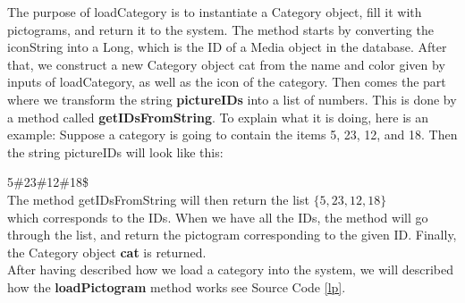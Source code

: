 The purpose of loadCategory is to instantiate a Category object, fill it with pictograms, and return it to the system.
The method starts by converting the iconString into a Long, which is the ID of a Media object in the database.
After that, we construct a new Category object cat from the name and color given by inputs of loadCategory, as well as the icon of the category.
Then comes the part where we transform the string \textbf{pictureIDs} into a list of numbers.
This is done by a method called \textbf{getIDsFromString}.
To explain what it is doing, here is an example:
Suppose a category is going to contain the items 5, 23, 12, and 18. Then the string pictureIDs will look like this:\newline

5\#23\#12\#18\$\\

The method getIDsFromString will then return the list\newline
\begin{math}
	\{5,23,12,18\}
\end{math}
\\
which corresponds to the IDs.
When we have all the IDs, the method will go through the list, and return the pictogram corresponding to the given ID.
Finally, the Category object \textbf{cat} is returned.\newline
\\
After having described how we load a category into the system, we will described how the \textbf{loadPictogram} method works see Source Code \ref{lp}.

